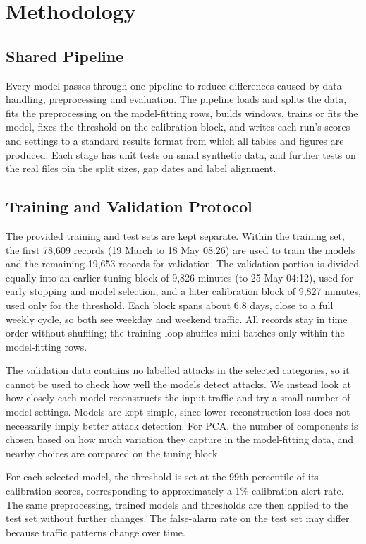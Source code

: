 \documentclass[conference]{IEEEtran}
\begin{document}
\section{Methodology}

\subsection{Shared Pipeline}
Every model passes through one pipeline to reduce differences caused by data handling, preprocessing and evaluation. The pipeline loads and splits the data, fits the preprocessing on the model-fitting rows, builds windows, trains or fits the model, fixes the threshold on the calibration block, and writes each run's scores and settings to a standard results format from which all tables and figures are produced. Each stage has unit tests on small synthetic data, and further tests on the real files pin the split sizes, gap dates and label alignment.

\subsection{Training and Validation Protocol}
The provided training and test sets are kept separate. Within the training set, the first 78,609 records (19 March to 18 May 08:26) are used to train the models and the remaining 19,653 records for validation. The validation portion is divided equally into an earlier tuning block of 9,826 minutes (to 25 May 04:12), used for early stopping and model selection, and a later calibration block of 9,827 minutes, used only for the threshold. Each block spans about 6.8 days, close to a full weekly cycle, so both see weekday and weekend traffic. All records stay in time order without shuffling; the training loop shuffles mini-batches only within the model-fitting rows.

The validation data contains no labelled attacks in the selected categories, so it cannot be used to check how well the models detect attacks. We instead look at how closely each model reconstructs the input traffic and try a small number of model settings. Models are kept simple, since lower reconstruction loss does not necessarily imply better attack detection. For PCA, the number of components is chosen based on how much variation they capture in the model-fitting data, and nearby choices are compared on the tuning block.

For each selected model, the threshold is set at the 99th percentile of its calibration scores, corresponding to approximately a 1\% calibration alert rate. The same preprocessing, trained models and thresholds are then applied to the test set without further changes. The false-alarm rate on the test set may differ because traffic patterns change over time.
\end{document}
